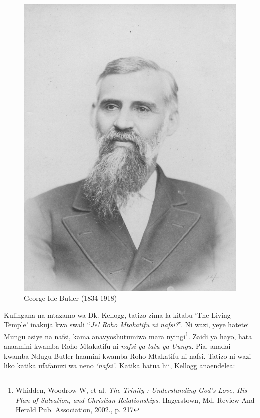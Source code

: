 \begin{figure}[hp]
    \centering
    \includegraphics[width=1\linewidth]{images/george-ide-butler.jpg}
    \caption*{George Ide Butler (1834-1918)}
    \label{fig:g-i-butler}
\end{figure}


Kulingana na mtazamo wa Dk. Kellogg, tatizo zima la kitabu ‘The Living Temple’ inakuja kwa swali “\textit{Je! Roho Mtakatifu ni nafsi?}”. Ni wazi, yeye hatetei Mungu asiye na nafsi, kama anavyoshutumiwa mara nyingi\footnote{Whidden, Woodrow W, et al. \textit{The Trinity : Understanding God's Love, His Plan of Salvation, and Christian Relationships}. Hagerstown, Md, Review And Herald Pub. Association, 2002., p. 217}. Zaidi ya hayo, hata anaamini kwamba Roho Mtakatifu ni \textit{nafsi ya tatu ya Uungu}. Pia, anadai kwamba Ndugu Butler haamini kwamba Roho Mtakatifu ni nafsi. Tatizo ni wazi liko katika ufafanuzi wa neno \textit{‘nafsi’}. Katika hatua hii, Kellogg anaendelea:


